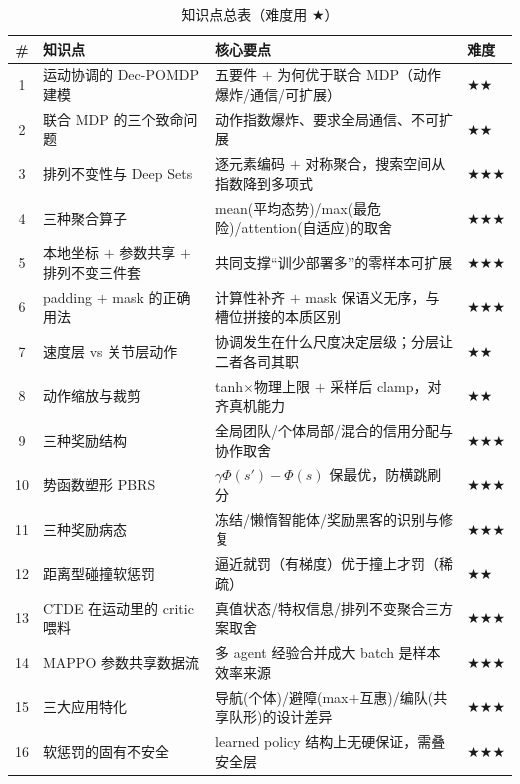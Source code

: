 \begin{table}[H]\centering\small
\caption{知识点总表（难度用 \texorpdfstring{$\bigstar$}{star}）}
\label{tab:mc-knowledge}
\begin{tabular}{clll}
\toprule
\# & 知识点 & 核心要点 & 难度 \\
\midrule
1 & 运动协调的 Dec-POMDP 建模 & 五要件 $+$ 为何优于联合 MDP（动作爆炸/通信/可扩展） & \(\bigstar\bigstar\) \\
2 & 联合 MDP 的三个致命问题 & 动作指数爆炸、要求全局通信、不可扩展 & \(\bigstar\bigstar\) \\
3 & 排列不变性与 Deep Sets & 逐元素编码 $+$ 对称聚合，搜索空间从指数降到多项式 & \(\bigstar\bigstar\bigstar\) \\
4 & 三种聚合算子 & mean(平均态势)/max(最危险)/attention(自适应)的取舍 & \(\bigstar\bigstar\bigstar\) \\
5 & 本地坐标 $+$ 参数共享 $+$ 排列不变三件套 & 共同支撑“训少部署多”的零样本可扩展 & \(\bigstar\bigstar\bigstar\) \\
6 & padding $+$ mask 的正确用法 & 计算性补齐 $+$ mask 保语义无序，与槽位拼接的本质区别 & \(\bigstar\bigstar\bigstar\) \\
7 & 速度层 vs 关节层动作 & 协调发生在什么尺度决定层级；分层让二者各司其职 & \(\bigstar\bigstar\) \\
8 & 动作缩放与裁剪 & tanh$\times$物理上限 $+$ 采样后 clamp，对齐真机能力 & \(\bigstar\bigstar\) \\
9 & 三种奖励结构 & 全局团队/个体局部/混合的信用分配与协作取舍 & \(\bigstar\bigstar\bigstar\) \\
10 & 势函数塑形 PBRS & $\gamma\Phi(s')-\Phi(s)$ 保最优，防横跳刷分 & \(\bigstar\bigstar\bigstar\) \\
11 & 三种奖励病态 & 冻结/懒惰智能体/奖励黑客的识别与修复 & \(\bigstar\bigstar\bigstar\) \\
12 & 距离型碰撞软惩罚 & 逼近就罚（有梯度）优于撞上才罚（稀疏） & \(\bigstar\bigstar\) \\
13 & CTDE 在运动里的 critic 喂料 & 真值状态/特权信息/排列不变聚合三方案取舍 & \(\bigstar\bigstar\bigstar\) \\
14 & MAPPO 参数共享数据流 & 多 agent 经验合并成大 batch 是样本效率来源 & \(\bigstar\bigstar\bigstar\) \\
15 & 三大应用特化 & 导航(个体)/避障(max$+$互惠)/编队(共享队形)的设计差异 & \(\bigstar\bigstar\bigstar\) \\
16 & 软惩罚的固有不安全 & learned policy 结构上无硬保证，需叠安全层 & \(\bigstar\bigstar\bigstar\) \\

\end{tabular}
\end{table}

